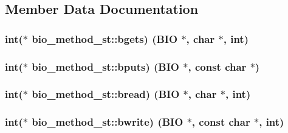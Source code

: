 \subsection{Member Data Documentation}
\subsubsection[{\texorpdfstring{bgets}{bgets}}]{\setlength{\rightskip}{0pt plus 5cm}int($\ast$ bio\+\_\+method\+\_\+st\+::bgets) ({\bf B\+IO} $\ast$, char $\ast$, int)}\hypertarget{structbio__method__st_a8fae124b9b9854cb1dfbee68db660b30}{}\label{structbio__method__st_a8fae124b9b9854cb1dfbee68db660b30}
\subsubsection[{\texorpdfstring{bputs}{bputs}}]{\setlength{\rightskip}{0pt plus 5cm}int($\ast$ bio\+\_\+method\+\_\+st\+::bputs) ({\bf B\+IO} $\ast$, const char $\ast$)}\hypertarget{structbio__method__st_a733f66ebc2d8c513c6a286ffbc629428}{}\label{structbio__method__st_a733f66ebc2d8c513c6a286ffbc629428}
\subsubsection[{\texorpdfstring{bread}{bread}}]{\setlength{\rightskip}{0pt plus 5cm}int($\ast$ bio\+\_\+method\+\_\+st\+::bread) ({\bf B\+IO} $\ast$, char $\ast$, int)}\hypertarget{structbio__method__st_aa92125381017c6b2641439943cce9072}{}\label{structbio__method__st_aa92125381017c6b2641439943cce9072}
\subsubsection[{\texorpdfstring{bwrite}{bwrite}}]{\setlength{\rightskip}{0pt plus 5cm}int($\ast$ bio\+\_\+method\+\_\+st\+::bwrite) ({\bf B\+IO} $\ast$, const char $\ast$, int)}\hypertarget{structbio__method__st_ae24e468c844e654724faccdc87d88a62}{}\label{structbio__method__st_ae24e468c844e654724faccdc87d88a62}
